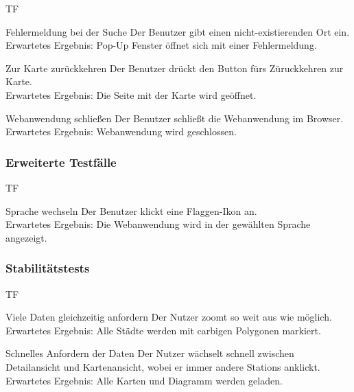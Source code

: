 \begin{Kriterien}{TF}
	\item[Fehlermeldung bei der Suche] Der Benutzer gibt einen nicht-existierenden Ort ein. \\ Erwartetes Ergebnis: Pop-Up Fenster öffnet sich mit einer Fehlermeldung.
	
	\item[Zur Karte zurückkehren] Der Benutzer drückt den Button fürs Züruckkehren zur Karte. \\ Erwartetes Ergebnis: Die Seite mit der Karte wird geöffnet. 
	
	\item[Webanwendung schließen] Der Benutzer schließt die Webanwendung im Browser. \\ Erwartetes Ergebnis: Webanwendung wird geschlossen.
\end{Kriterien}
\subsubsection{Erweiterte Testfälle}
\begin{Kriterien}{TF}
	
	\item[Sprache wechseln] Der Benutzer klickt eine Flaggen-Ikon an. \\ Erwartetes Ergebnis: Die Webanwendung wird in der gewählten Sprache angezeigt.
	
\end{Kriterien}
\subsubsection{Stabilitätstests}
\begin{Kriterien}{TF}

	\item[Viele Daten gleichzeitig anfordern] Der Nutzer zoomt so weit aus wie möglich.\\ Erwartetes Ergebnis: Alle Städte werden mit carbigen Polygonen markiert.

	\item[Schnelles Anfordern der Daten] Der Nutzer wächselt schnell zwischen Detailansicht und Kartenansicht, wobei er immer andere \glspl{Station} anklickt. \\ Erwartetes Ergebnis: Alle Karten und Diagramm werden geladen.

\end{Kriterien}
